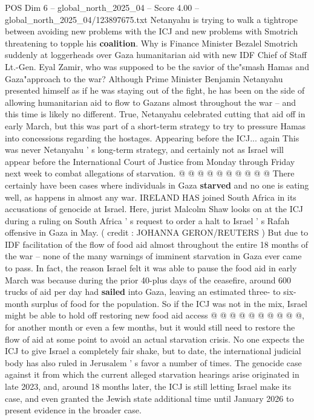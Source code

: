 \begin{textsample}{POS Dim 6 – global\_north\_2025\_04 – Score 4.00 – global\_north\_2025\_04/123897675.txt}  \label{ex:f6_pos_199}
Netanyahu is trying to walk a tightrope between avoiding new problems with the ICJ and new problems with Smotrich threatening to topple his \textbf{coalition}.
Why is Finance Minister Bezalel Smotrich suddenly at loggerheads over Gaza humanitarian aid with new IDF Chief of Staff Lt.-Gen.
Eyal Zamir, who was supposed to be the savior of the"smash Hamas and Gaza"approach to the war?
Although Prime Minister Benjamin Netanyahu presented himself as if he was staying out of the fight, he has been on the side of allowing humanitarian aid to flow to Gazans almost throughout the war -- and this time is likely no different.
True, Netanyahu celebrated cutting that aid off in early March, but this was part of a short-term strategy to try to pressure Hamas into concessions regarding the hostages.
Appearing before the ICJ... again This was never Netanyahu ' s long-term strategy, and certainly not as Israel will appear before the International Court of Justice from Monday through Friday next week to combat allegations of starvation. @ @ @ @ @ @ @ @ @ @ There certainly have been cases where individuals in Gaza \textbf{starved} and no one is eating well, as happens in almost any war.
IRELAND HAS joined South Africa in its accusations of genocide at Israel.
Here, jurist Malcolm Shaw looks on at the ICJ during a ruling on South Africa ' s request to order a halt to Israel ' s Rafah offensive in Gaza in May. ( credit : JOHANNA GERON/REUTERS ) But due to IDF facilitation of the flow of food aid almost throughout the entire 18 months of the war -- none of the many warnings of imminent starvation in Gaza ever came to pass.
In fact, the reason Israel felt it was able to pause the food aid in early March was because during the prior 40-plus days of the ceasefire, around 600 trucks of aid per day had \textbf{sailed} into Gaza, leaving an estimated three- to six-month surplus of food for the population.
So if the ICJ was not in the mix, Israel might be able to hold off restoring new food aid access @ @ @ @ @ @ @ @ @ @, for another month or even a few months, but it would still need to restore the flow of aid at some point to avoid an actual starvation crisis.
No one expects the ICJ to give Israel a completely fair shake, but to date, the international judicial body has also ruled in Jerusalem ' s favor a number of times.
The genocide case against it from which the current alleged starvation hearings arise originated in late 2023, and, around 18 months later, the ICJ is still letting Israel make its case, and even granted the Jewish state additional time until January 2026 to present evidence in the broader case.

\end{textsample}

